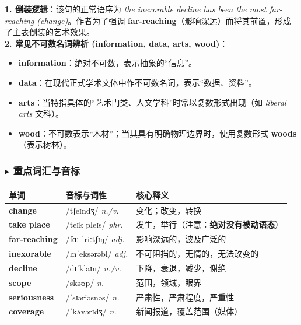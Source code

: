 \documentclass[cn,normal,11pt]{elegantnote}
\newcommand{\retrokey}[1]{{\color{accentcolor}\textbf{#1}}}
\renewcommand{\citshape}{\kaishu\fontspec{Arial}}
\begin{document}
\begin{proposition}[倒装与语法细节辨析]
  \textbf{1. 倒装逻辑}：该句的正常语序为 \textit{the inexorable decline has been the most far-reaching (change)}。作者为了强调 \textbf{far-reaching}（影响深远）而将其前置，形成了主表倒装的艺术效果。\\
  \textbf{2. 常见不可数名词辨析 (information, data, arts, wood)}：
  \begin{itemize}
    \item \textbf{information}：绝对不可数，表示抽象的“信息”。
    \item \textbf{data}：在现代正式学术文体中作不可数名词，表示“数据、资料”。
    \item \textbf{arts}：当特指具体的“艺术门类、人文学科”时常以复数形式出现（如 \textit{liberal arts} 文科）。
    \item \textbf{wood}：不可数表示“木材”；当其具有明确物理边界时，使用复数形式 \textbf{woods}（表示树林）。
  \end{itemize}
\end{proposition}

\subsubsection*{$\blacktriangleright$ 重点词汇与音标}
\noindent
\begin{tabularx}{\textwidth}{l X p{7cm}}
  \toprule
  \textbf{单词} & \textbf{音标与词性} & \textbf{核心释义} \\
  \midrule
  \retrokey{change} & {\citshape /tʃeɪndʒ/} \textit{n./v.} & 变化；改变，转换 \\
  \midrule
  \retrokey{take place} & {\citshape /teɪk pleɪs/} \textit{phr.} & 发生，举行（注意：\textbf{绝对没有被动语态}） \\
  \midrule
  \retrokey{far-reaching} & {\citshape /fɑː ˈriːtʃɪŋ/} \textit{adj.} & 影响深远的，波及广泛的 \\
  \midrule
  \retrokey{inexorable} & {\citshape /ɪnˈeksərəbl/} \textit{adj.} & 不可阻挡的，无情的，无法改变的 \\
  \midrule
  \retrokey{decline} & {\citshape /dɪˈklaɪn/} \textit{n./v.} & 下降，衰退，减少，谢绝 \\
  \midrule
  \retrokey{scope} & {\citshape /skəʊp/} \textit{n.} & 范围，领域，眼界 \\
  \midrule
  \retrokey{seriousness} & {\citshape /ˈsɪəriəsnəs/} \textit{n.} & 严肃性，严肃程度，严重性 \\
  \midrule
  \retrokey{coverage} & {\citshape /ˈkʌvərɪdʒ/} \textit{n.} & 新闻报道，覆盖范围（媒体） \\
  \bottomrule
\end{tabularx}
\end{document}
